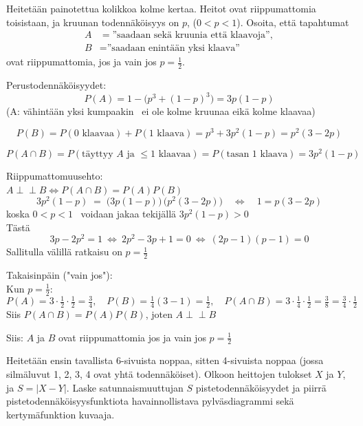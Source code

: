 \documentclass[12pt,a4paper]{article}
\newcommand{\riip}{\perp \!\!\! \perp}
\begin{document}
\pagebreak
{}
Heitetään painotettua kolikkoa kolme kertaa. Heitot ovat riippumattomia toisistaan, ja kruunan todennäköisyys on $p$, ($0<p<1$). Osoita, että tapahtumat
\begin{align*}
A&=\text{''saadaan sekä kruunia että klaavoja''},\\
B&=\text{''saadaan enintään yksi klaava''}
\end{align*}
ovat riippumattomia, jos ja vain jos $p=\frac{1}{2}$.


\begin{alakohta}
\item Perustodennäköisyydet:
\[
P(A)=1-\big(p^3+(1-p)^3\big)=3p(1-p)
\]
(A: vähintään yksi kumpaakin \Leftrightarrow \, ei ole
kolme kruunaa eikä kolme klaavaa)

\[
P(B)=P(\text{0 klaavaa})+P(\text{1 klaava})
= p^3+3p^2(1-p)=p^2(3-2p)
\]

\[
P(A\cap B)=P(\text{täyttyy $A$ ja $\le1$ klaavaa})
= P(\text{tasan 1 klaava})
=3p^2(1-p)
\]

\item Riippumattomuusehto:\\ $A\riip B \iff P(A\cap B)=P(A)P(B)$
\[
3p^2(1-p)\;=\; \big(3p(1-p)\big)\,\big(p^2(3-2p)\big)
\quad\Longleftrightarrow\quad
1=p(3-2p)
\]
koska $0<p<1$ \Rightarrow \, voidaan jakaa tekijällä $3p^2(1-p)>0$\\
Tästä
\[
3p-2p^2=1\ \Longleftrightarrow\ 2p^2-3p+1=0
\ \Longleftrightarrow\ (2p-1)(p-1)=0
\]
Sallitulla välillä ratkaisu on \(p=\tfrac12\)

\item Takaisinpäin ("vain jos"): \\Kun \(p=\tfrac12\):
\[
P(A)=3\cdot\tfrac12\cdot\tfrac12=\tfrac34,\quad
P(B)=\tfrac14(3-1)=\tfrac12,\quad
P(A\cap B)=3\cdot\tfrac14\cdot\tfrac12=\tfrac38=\tfrac34\cdot\tfrac12
\]
Siis \(P(A\cap B)=P(A)P(B)\), joten \(A\riip B\)
\end{alakohta}

\noindent Siis: \(A\) ja \(B\) ovat riippumattomia jos ja 
vain jos \(p=\tfrac12\)










\pagebreak
{}
Heitetään ensin tavallista 6-sivuista noppaa, sitten 
4-sivuista noppaa (jossa silmäluvut 1, 2, 3, 4 ovat yhtä todennäköiset).
Olkoon heittojen tulokset $X$ ja $Y$, ja $S=|X-Y|$. Laske satunnaismuuttujan $S$ pistetodennäköisyydet ja piirrä pistetodennäköisyysfunktiota havainnollistava pylväsdiagrammi sekä kertymäfunktion kuvaaja.\\
\end{document}
